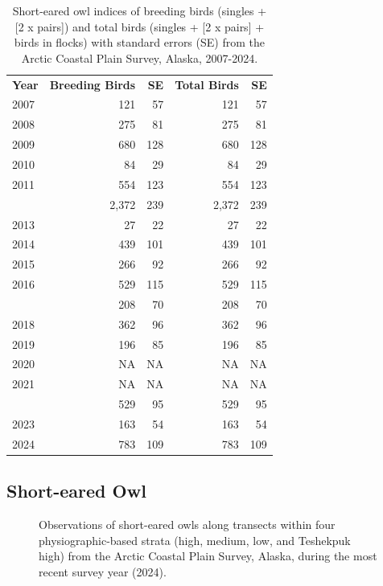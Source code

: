 \documentclass[
]{article}
\begin{document}
\begin{longtable}[t]{lrrrr}

\caption{\label{tbl-SEOW}Short-eared owl indices of breeding birds
(singles + {[}2 x pairs{]}) and total birds (singles + {[}2 x pairs{]} +
birds in flocks) with standard errors (SE) from the Arctic Coastal Plain
Survey, Alaska, 2007-2024.}

\tabularnewline

\\
\toprule
\textbf{Year} & \textbf{Breeding Birds} & \textbf{SE} & \textbf{Total Birds} & \textbf{SE}\\
\midrule
2007 & 121 & 57 & 121 & 57\\
2008 & 275 & 81 & 275 & 81\\
2009 & 680 & 128 & 680 & 128\\
2010 & 84 & 29 & 84 & 29\\
2011 & 554 & 123 & 554 & 123\\
\addlinespace
2012 & 2,372 & 239 & 2,372 & 239\\
2013 & 27 & 22 & 27 & 22\\
2014 & 439 & 101 & 439 & 101\\
2015 & 266 & 92 & 266 & 92\\
2016 & 529 & 115 & 529 & 115\\
\addlinespace
2017 & 208 & 70 & 208 & 70\\
2018 & 362 & 96 & 362 & 96\\
2019 & 196 & 85 & 196 & 85\\
2020 & NA & NA & NA & NA\\
2021 & NA & NA & NA & NA\\
\addlinespace
2022 & 529 & 95 & 529 & 95\\
2023 & 163 & 54 & 163 & 54\\
2024 & 783 & 109 & 783 & 109\\
\bottomrule

\end{longtable}

\endgroup{}

\newpage{}

\subsection*{Short-eared Owl}\label{short-eared-owl-2}

\begin{figure}


\caption{\label{fig-SEOWmap}Observations of short-eared owls along
transects within four physiographic-based strata (high, medium, low, and
Teshekpuk high) from the Arctic Coastal Plain Survey, Alaska, during the
most recent survey year (2024).}

\end{figure}%
\end{document}
